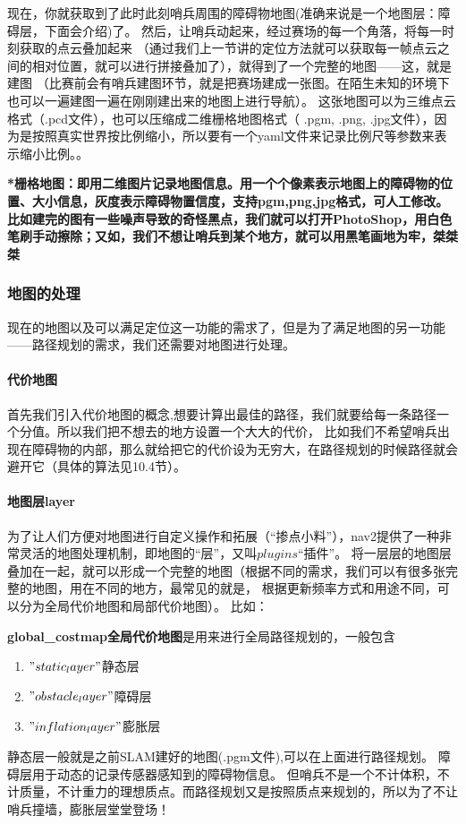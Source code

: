 现在，你就获取到了此时此刻哨兵周围的障碍物地图(准确来说是一个地图层：障碍层，下面会介绍)了。
然后，让哨兵动起来，经过赛场的每一个角落，将每一时刻获取的点云叠加起来
（通过我们上一节讲的定位方法就可以获取每一帧点云之间的相对位置，就可以进行拼接叠加了），就得到了一个完整的地图——这，就是建图
（比赛前会有哨兵建图环节，就是把赛场建成一张图。在陌生未知的环境下也可以一遍建图一遍在刚刚建出来的地图上进行导航）。
这张地图可以为三维点云格式（.pcd文件），也可以压缩成二维栅格地图格式（ .pgm, .png, .jpg文件），因为是按照真实世界按比例缩小，所以要有一个yaml文件来记录比例尺等参数来表示缩小比例。。

\textbf{*栅格地图：即用二维图片记录地图信息。用一个个像素表示地图上的障碍物的位置、大小信息，灰度表示障碍物置信度，支持pgm,png,jpg格式，可人工修改。
比如建完的图有一些噪声导致的奇怪黑点，我们就可以打开PhotoShop，用白色笔刷手动擦除；又如，我们不想让哨兵到某个地方，就可以用黑笔画地为牢，桀桀桀}

\subsubsection{ 地图的处理}
现在的地图以及可以满足定位这一功能的需求了，但是为了满足地图的另一功能——路径规划的需求，我们还需要对地图进行处理。

\paragraph{ 代价地图}
首先我们引入代价地图的概念,想要计算出最佳的路径，我们就要给每一条路径一个分值。所以我们把不想去的地方设置一个大大的代价，
比如我们不希望哨兵出现在障碍物的内部，那么就给把它的代价设为无穷大，在路径规划的时候路径就会避开它（具体的算法见10.4节）。

\paragraph{ 地图层layer}
为了让人们方便对地图进行自定义操作和拓展（“掺点小料”），nav2提供了一种非常灵活的地图处理机制，即地图的“层”，又叫$plugins$“插件”。
将一层层的地图层叠加在一起，就可以形成一个完整的地图（根据不同的需求，我们可以有很多张完整的地图，用在不同的地方，最常见的就是，
根据更新频率方式和用途不同，可以分为全局代价地图和局部代价地图）。
比如：

\textbf{global\_costmap全局代价地图}是用来进行全局路径规划的，一般包含
\begin{enumerate}
    \item $"static_layer"$静态层
    \item $"obstacle_layer"$障碍层
    \item $"inflation_layer"$膨胀层
\end{enumerate}
静态层一般就是之前SLAM建好的地图(.pgm文件),可以在上面进行路径规划。
障碍层用于动态的记录传感器感知到的障碍物信息。
但哨兵不是一个不计体积，不计质量，不计重力的理想质点。而路径规划又是按照质点来规划的，所以为了不让哨兵撞墙，膨胀层堂堂登场！

